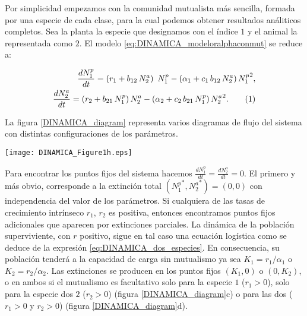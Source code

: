 Por simplicidad empezamos con la comunidad mutualista más sencilla, formada por una especie de cada clase, para la cual podemos obtener resultados análiticos completos. Sea la planta la especie que designamos con el índice $1$ y el animal la representada como $2$. El modelo \ref{eq:DINAMICA_modeloralphaconmut} se reduce a:

\begin{align}
\frac{dN^p_{1}}{dt} = \left( r_{1}+ b_{12}\, N^a_{2}\right) \ N^p_{1} - \left(\alpha_{1}+ c_{1} \, b_{12} \, N^a_{2} \right) {N^p_{1}}^2 ,\nonumber\\ 
\frac{dN^a_{2}}{dt} = \left( r_{2}+ b_{21}\, N^p_{1}\right)N^a_{2} - \left(\alpha_{2}+ c_{2} \, b_{21}\, N^p_{1} \right) {N^a_{2}}^2 .
\stepcounter{equation}\tag{\theequation}\label{eq:DINAMICA_dos_especies}
\end{align}

La figura \ref{DINAMICA_diagram} representa varios diagramas de flujo del sistema con distintas configuraciones de los parámetros.

\begin{figure*}
\centering
\texttt{[image: DINAMICA\_Figure1h.eps]}
\caption {Diagrma de flujo de la dinámica de una comunidad de dos especies según el modelo de ecuaciones \ref{eq:DINAMICA_dos_especies}. Los puntos fijos se han resaltado como círculos de color rojo. El color de las flechas indica la intensidad del flujo. Las cuatro imágenes corresponden a diferentes valores para las tases intrínsecas de crecimimento. El resto de parámetros mantiene los mismos valores en los cuatro casos: $\alpha_1 = \alpha_2 = 0.008$, $b_{12} = b_{21} = 0.4$ and $c_1 = c_2 = 0.008$. El mutualismo es obligatorio en a) y b), aunque en diferente grado en el segundo diagrama. Es obligatorio para la especie 2 es c), mientras que la especie 1 podría sobrevivir sin la 2. En d) el mutualismo es facultativo para ambas especies.}
\label{DINAMICA_diagram}
\end{figure*}

Para encontrar los puntos fijos del sistema hacemos $\frac{dN^p_{1}}{dt} = \frac{dN^a_{2}}{dt} = 0$. El primero y más obvio, corresponde a la extinción total $({N^p_{1}}^*,{N^a_{2}}^*) = (0,0)$ con independencia del valor de los parámetros. Si cualquiera de las tasas de crecimiento intrínseco $r_1$, $r_2$ es positiva, entonces encontramos puntos fijos adicionales que aparecen por extinciones parciales. La dinámica de la población superviviente, con $r$ positivo, sigue en tal caso una ecuación logística como se deduce de la expresión \ref{eq:DINAMICA_dos_especies}. En consecuencia, su población tenderá a la capacidad de carga sin mutualismo ya sea $K_1 = r_1/\alpha_1$ o $K_2 = r_2/\alpha_2$. Las extinciones se producen en los puntos fijos $(K_1,0)$ o $(0,K_2)$, o en ambos si el mutualismo es facultativo solo para la especie $1$ ($r_1 >0$), solo para la especie dos $2$ ($r_2 >0$) (figura \ref{DINAMICA_diagram}c) o para las dos ($r_1>0$ y $r_2 >0$) (figura \ref{DINAMICA_diagram}d). 

